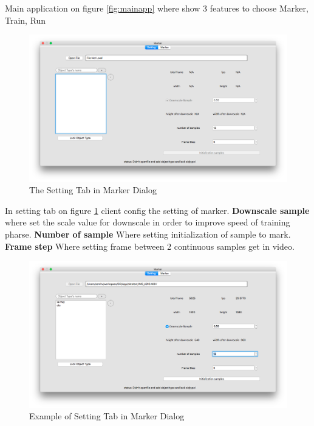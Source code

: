 Main application on figure \ref{fig:mainapp} where show 3 features to choose Marker, Train, Run

\begin{center}
    \begin{figure}[H]
      \includegraphics[width=\textwidth]{Chapters/Fig/marker-setting}
      \caption{The Setting Tab in Marker Dialog}
      \label{fig:marker-setting}
    \end{figure}
  \end{center}
  \begin{center}
\end{center}

In setting tab on figure \ref{fig:marker-setting} client config the setting of marker. 
\textbf{Downscale sample} where set the scale value for downscale in order to improve speed of training pharse.
\textbf{Number of sample} Where setting initialization of sample to mark.
\textbf{Frame step} Where setting frame between 2 continuous samples get in video.

\begin{center}
  \begin{figure}[H]
    \includegraphics[width=\textwidth]{Chapters/Fig/setting-marker}
    \caption{Example of Setting Tab in Marker Dialog}
    \label{fig:Setting-marker}
  \end{figure}
\end{center}
\begin{center}
\end{center}

